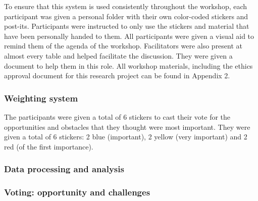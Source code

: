 To ensure that this system is used consistently throughout the workshop, each participant was given a personal folder with their own color-coded stickers and post-its. Participants were instructed to only use the stickers and material that have been personally handed to them. All participants were given a visual aid to remind them of the agenda of the workshop. Facilitators were also present at almost every table and helped facilitate the discussion. They were given a document to help them in this role. All workshop materials, including the ethics approval document for this research project can be found in Appendix 2.\\

\subsubsection*{Weighting system}

 The participants were given a total of 6 stickers to cast their vote for the opportunities and obstacles that they thought were most important. They were given a total of 6 stickers: 2 blue (important), 2 yellow (very important) and 2 red (of the first importance).\\

\subsubsection{Data processing and analysis}

\subsubsection*{Voting: opportunity and challenges}

